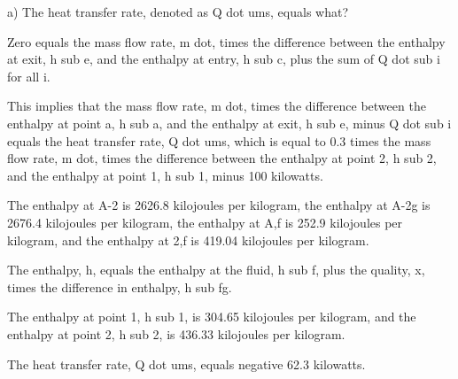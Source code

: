 a) The heat transfer rate, denoted as Q dot ums, equals what?

Zero equals the mass flow rate, m dot, times the difference between the enthalpy at exit, h sub e, and the enthalpy at entry, h sub c, plus the sum of Q dot sub i for all i.

This implies that the mass flow rate, m dot, times the difference between the enthalpy at point a, h sub a, and the enthalpy at exit, h sub e, minus Q dot sub i equals the heat transfer rate, Q dot ums, which is equal to 0.3 times the mass flow rate, m dot, times the difference between the enthalpy at point 2, h sub 2, and the enthalpy at point 1, h sub 1, minus 100 kilowatts.

The enthalpy at A-2 is 2626.8 kilojoules per kilogram, the enthalpy at A-2g is 2676.4 kilojoules per kilogram, the enthalpy at A,f is 252.9 kilojoules per kilogram, and the enthalpy at 2,f is 419.04 kilojoules per kilogram.

The enthalpy, h, equals the enthalpy at the fluid, h sub f, plus the quality, x, times the difference in enthalpy, h sub fg.

The enthalpy at point 1, h sub 1, is 304.65 kilojoules per kilogram, and the enthalpy at point 2, h sub 2, is 436.33 kilojoules per kilogram.

The heat transfer rate, Q dot ums, equals negative 62.3 kilowatts.